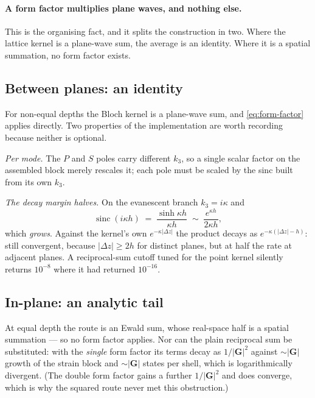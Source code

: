 \documentclass[11pt,a4paper]{article}
\newcommand{\D}{\Delta}
\begin{document}
\paragraph{A form factor multiplies plane waves, and nothing else.}
This is the organising fact, and it splits the construction in two. Where the
lattice kernel is a plane-wave sum, the average is an identity. Where it is a
spatial summation, no form factor exists.

\subsection{Between planes: an identity}

For non-equal depths the Bloch kernel is a plane-wave sum, and
\eqref{eq:form-factor} applies directly. Two properties of the implementation
are worth recording because neither is optional.

\emph{Per mode.} The $P$ and $S$ poles carry different $k_3$, so a single scalar
factor on the assembled block merely rescales it; each pole must be scaled by
the sinc built from its own $k_3$.

\emph{The decay margin halves.} On the evanescent branch $k_3 = i\kappa$ and
%
\begin{equation}
  \operatorname{sinc}(i\kappa h) \;=\; \frac{\sinh \kappa h}{\kappa h}
  \;\sim\; \frac{e^{\kappa h}}{2\kappa h},
\end{equation}
%
which \emph{grows}. Against the kernel's own $e^{-\kappa|\D z|}$ the product
decays as $e^{-\kappa(|\D z|-h)}$: still convergent, because $|\D z|\ge 2h$ for
distinct planes, but at half the rate at adjacent planes. A reciprocal-sum
cutoff tuned for the point kernel silently returns $10^{-8}$ where it had
returned $10^{-16}$.

\subsection{In-plane: an analytic tail}

At equal depth the route is an Ewald sum, whose real-space half is a spatial
summation --- so no form factor applies. Nor can the plain reciprocal sum be
substituted: with the \emph{single} form factor its terms decay as $1/|\bm{G}|^{2}$
against $\sim|\bm{G}|$ growth of the strain block and $\sim|\bm{G}|$ states per
shell, which is logarithmically divergent. (The double form factor gains a
further $1/|\bm{G}|^{2}$ and does converge, which is why the squared route never
met this obstruction.)
\end{document}
